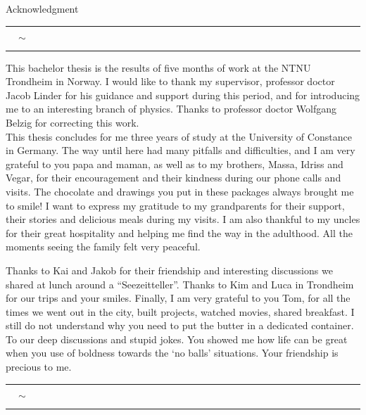 \documentclass[../main.tex]{subfile}
\begin{document}
\thispagestyle{empty}
\vspace*{24pt}
\begin{center}
    \LARGE Acknowledgment \normalsize\vspace{24pt}\\
    \rule[3pt]{0.04\textwidth}{0.2pt} $\quad\sim\quad$\rule[3pt]{.04\textwidth}{0.2pt} 
\end{center}
\vspace*{12pt}


This bachelor thesis is the results of five months of work at the NTNU Trondheim in Norway. I would like to thank my supervisor, professor doctor Jacob Linder
for his guidance and support during this period, and for introducing me to an interesting branch of physics. Thanks to professor doctor Wolfgang Belzig for 
correcting this work.\\

This thesis concludes for me three years of study at the University of Constance in Germany. The way until here had many pitfalls and difficulties, and I am very grateful to 
you papa and maman, as well as to my brothers, Massa, Idriss and Vegar, for their encouragement and their kindness during our phone calls and visits. The chocolate and drawings you put in these packages
always brought me to smile! I want to express my gratitude to my grandparents for their support, their stories and delicious meals during my visits. I am also thankful
to my uncles for their great hospitality and helping me find the way in the adulthood. All the moments seeing the family felt very peaceful.

Thanks to Kai and Jakob for their friendship and interesting discussions we shared at lunch around a ``Seezeitteller''. Thanks to Kim and Luca 
in Trondheim for our trips and your smiles. Finally, I am very grateful to you Tom, for all the times we went out in the city, built projects,
watched movies, shared breakfast. I still do not understand why you need to put the butter in a dedicated container. 
To our deep discussions and stupid jokes. You showed me how life can be great when you use of boldness towards the `no balls' situations.
Your friendship is precious to me.

\begin{center}
    \rule{0.1\textwidth}{0.2pt} $\quad\sim\quad$\rule{0.1\textwidth}{0.2pt} 
\end{center}
\end{document}
